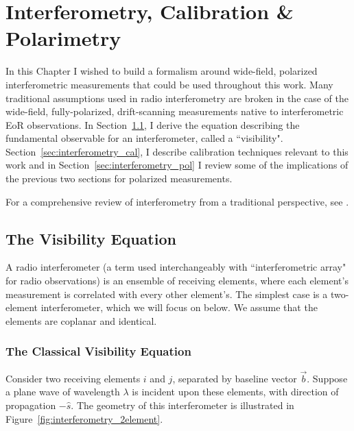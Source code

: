 \chapter{Interferometry, Calibration \& Polarimetry}
\label{chapter:interferometry}

In this Chapter I wished to build a formalism around wide-field, polarized interferometric measurements that could be used throughout this work. Many traditional assumptions used in radio interferometry are broken in the case of the wide-field, fully-polarized, drift-scanning measurements native to interferometric EoR observations. In Section~\ref{sec:interferometry_vis}, I derive the equation describing the fundamental observable for an interferometer, called a ``visibility". Section~\ref{sec:interferometry_cal}, I describe calibration techniques relevant to this work and in Section~\ref{sec:interferometry_pol} I review some of the implications of the previous two sections for polarized measurements.

For a comprehensive review of interferometry from a traditional perspective, see \cite{TMS}.

\section{The Visibility Equation}
\label{sec:interferometry_vis}

A radio interferometer (a term used interchangeably with ``interferometric array" for radio observations) is an ensemble of receiving elements, where each element's measurement is correlated with every other element's. The simplest case is a two-element interferometer, which we will focus on below. We assume that the elements are coplanar and identical.

\subsection{The Classical Visibility Equation}

Consider two receiving elements $i$ and $j$, separated by baseline vector $\vec{b}$. Suppose a plane wave of wavelength $\lambda$ is incident upon these elements, with direction of propagation $-\hat{s}$. The geometry of this interferometer is illustrated in Figure~\ref{fig:interferometry_2element}.

